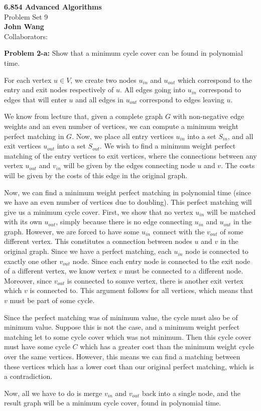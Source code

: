 \documentclass[psamsfonts]{amsart}
\newenvironment{sol}{\vspace{0.25cm}{\large \bfseries Solution:}}{\qedsymbol}
\newenvironment{prob}[1]{\begin{framed}{\large \bfseries Problem #1:}}{\end{framed}}
\newcommand{\makenewtitle}{
    \begin{center}
    {\huge \bfseries 6.854 Advanced Algorithms} \\
    Problem Set 9\\
    \vspace{0.25cm}
    {\bfseries John Wang} \\
    Collaborators:  
    \end{center}
    \vspace{0.5cm}
}
\begin{document}
\makenewtitle

\begin{prob}{2-a}
Show that a minimum cycle cover can be found in polynomial time.
\end{prob}
\begin{sol}
For each vertex $u \in V$, we create two nodes $u_{in}$ and $u_{out}$ which correspond to the entry and exit nodes respectively of $u$. All edges going into $u_{in}$ correspond to edges that will enter $u$ and all edges in $u_{out}$ correspond to edges leaving $u$.

We know from lecture that, given a complete graph $G$ with non-negative edge weights and an even number of vertices, we can compute a minimum weight perfect matching in $G$. Now, we place all entry vertices $u_{in}$ into a set $S_{in}$, and all exit vertices $u_{out}$ into a set $S_{out}$. We wish to find a minimum weight perfect matching of the entry vertices to exit vertices, where the connections between any vertex $u_{out}$ and $v_{in}$ will be given by the edges connecting node $u$ and $v$. The costs will be given by the costs of this edge in the original graph. 

Now, we can find a minimum weight perfect matching in polynomial time (since we have an even number of vertices due to doubling). This perfect matching will give us a minimum cycle cover. First, we show that no vertex $u_{in}$ will be matched with its own $u_{out}$, simply because there is no edge connecting $u_{in}$ and $u_{out}$ in the graph. However, we are forced to have some $u_{in}$ connect with the $v_{out}$ of some different vertex. This constitutes a connection between nodes $u$ and $v$ in the original graph. Since we have a perfect matching, each $u_{in}$ node is connected to exactly one other $v_{out}$ node. Since each entry node is connected to the exit node of a different vertex, we know vertex $v$ must be connected to a different node. Moreover, since $v_{out}$ is connected to somve vertex, there is another exit vertex which $v$ is connected to. This argument follows for all vertices, which means that $v$ must be part of some cycle. 

Since the perfect matching was of minimum value, the cycle must also be of minimum value. Suppose this is not the case, and a minimum weight perfect matching let to some cycle cover which was not minimum. Then this cycle cover must have some cycle $C$ which has a greater cost than the minimum weight cycle over the same vertices. However, this means we can find a matching between these vertices which has a lower cost than our original perfect matching, which is a contradiction.

Now, all we have to do is merge $v_{in}$ and $v_{out}$ back into a single node, and the result graph will be a minimum cycle cover, found in polynomial time.
\end{sol}
\end{document}
